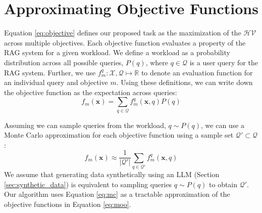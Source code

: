 \section{Approximating Objective Functions}
\label{sec:approx_objective}
Equation \ref{eq:objective} defines our proposed task as the maximization of the $\mathcal{HV}$ across multiple objectives. Each objective function evaluates a property of the RAG system for a given workload. We define a workload as a probability distribution across all possible queries, $P(q)$, where $q \in \mathcal{Q}$ is a user query for the RAG system. Further, we use $f_m^q: \mathcal{X}, \mathcal{Q} \mapsto \mathbb{R}$  to denote an evaluation function for an individual query and objective $m$. Using these definitions, we can write down the objective function as the expectation across queries:
\begin{equation}
    f_m(\mathbf{x}) = \sum_{q \in \mathcal{Q}} f_m^q(\mathbf{x}, q) P(q)
\end{equation}

Assuming we can sample queries from the workload, $q \sim P(q)$, we can use a Monte Carlo approximation for each objective function using a sample set $\mathcal{Q'} \subset \mathcal{Q}$:
\begin{equation}
\label{eq:mc}
    f_m(\mathbf{x}) \approx \frac{1}{|\mathcal{Q'}|}\sum_{q \in \mathcal{Q'}} f_m^q(\mathbf{x}, q)
\end{equation}
We assume that generating data synthetically using an LLM (Section \ref{sec:synthetic_data}) is equivalent to sampling queries $q \sim P(q)$ to obtain $\mathcal{Q'}$.
Our algorithm uses Equation \ref{eq:mc} as a tractable approximation of the objective functions in Equation \ref{eq:moo}.